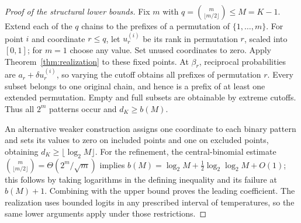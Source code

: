 \documentclass[10pt]{article}
\theoremstyle{definition}\newtheorem{definition}[theorem]{Definition}
\theoremstyle{remark}\newtheorem{remark}[theorem]{Remark}
\newcommand{\1}{\mathbf 1}
\begin{document}
\begin{proof}[Proof of the structural lower bounds]
Fix $m$ with $q=\binom m{\lfloor m/2\rfloor}\le M=K-1$. Extend each of the $q$ chains to the prefixes of a permutation of $\{1,\ldots,m\}$. For point $i$ and coordinate $r\le q$, let $u_r^{(i)}$ be its rank in permutation $r$, scaled into $[0,1]$; for $m=1$ choose any value. Set unused coordinates to zero. Apply Theorem~\ref{thm:realization} to these fixed points. At $\beta_r$, reciprocal probabilities are $a_r+\delta u_r^{(i)}$, so varying the cutoff obtains all prefixes of permutation $r$. Every subset belongs to one original chain, and hence is a prefix of at least one extended permutation. Empty and full subsets are obtainable by extreme cutoffs. Thus all $2^m$ patterns occur and $d_K\ge b(M)$.

An alternative weaker construction assigns one coordinate to each binary pattern and sets its values to zero on included points and one on excluded points, obtaining $d_K\ge\lfloor\log_2M\rfloor$. For the refinement, the central-binomial estimate
$\binom m{\lfloor m/2\rfloor}=\Theta(2^m/\sqrt m)$ implies
$b(M)=\log_2M+\tfrac12\log_2\log_2M+O(1)$; this follows by taking logarithms in the defining inequality and its failure at $b(M)+1$. Combining with the upper bound proves the leading coefficient. The realization uses bounded logits in any prescribed interval of temperatures, so the same lower arguments apply under those restrictions.
\end{proof}
\end{document}
